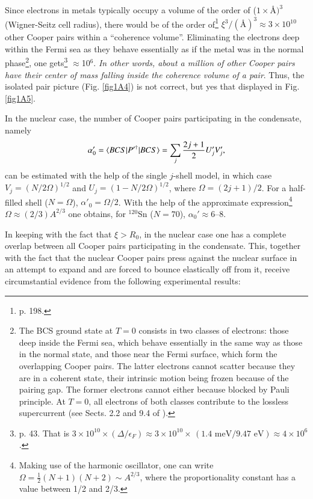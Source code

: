 Since electrons in metals typically occupy a volume of the order of ($1\times$\AA$)^3$ (Wigner-Seitz cell radius), there would be of the order of\footnote{\cite{Ketterson:99} p. 198.} $\xi^3/(\text{\AA})^3\approx 3\times10^{10}$ other Cooper pairs within a ``coherence volume''. Eliminating the electrons deep within the Fermi sea as they behave essentially as if the metal was in the normal phase\footnote{The BCS ground state at $T=0$ consists in two classes of electrons: those deep inside the Fermi sea, which behave essentially in the same way as those in the normal state, and those near the Fermi surface, which form the overlapping Cooper pairs. The latter electrons cannot scatter because they are in a coherent state, their intrinsic motion being frozen because of the pairing gap. The former electrons  cannot either because  blocked by Pauli principle. At $T=0$, all electrons of both classes contribute to the lossless supercurrent (see Sects. 2.2 and 9.4 of \cite{Waldram:96}).}, one gets\footnote{\cite{Schrieffer:64} p. 43.  That is $3\times10^{10}\times(\Delta/\epsilon_F)\approx3\times10^{10}\times\,(1.4\text{ meV}/9.47\text{ eV})\approx 4\times 10^{6}$.} $\approx$10$^6$. \textit{In other words, about a million of other Cooper pairs have their center of mass falling inside the coherence volume of a pair}. Thus, the isolated pair picture (Fig. \ref{fig1A4}) is not correct, but yes that displayed in Fig. \ref{fig1A5}.





 


 In the nuclear case, the number of Cooper pairs participating in the condensate, namely  
 \begin{align}\label{eq3B11}
\alpha'_0=\braket{BCS|P'^\dagger|BCS}=\sum_j\frac{2j+1}{2}U'_jV'_j, \idx{Cooper pair!number of}
 \end{align}
 can be estimated  with the help of the single $j$-shell model, in which case $V_j=(N/2\Omega)^{1/2}$ and $U_j=(1-N/2\Omega)^{1/2}$, where $\Omega=(2j+1)/2$. For a half-filled shell ($N=\Omega$),  $\alpha'_0=\Omega/2$. With the help of the approximate expression\footnote{Making use of the harmonic oscillator, one can write $\Omega=\frac{1}{2}(N+1)(N+2)\sim A^{2/3}$, where the proportionality constant has a value between 1/2 and 2/3.} $\Omega\approx(2/3)A^{2/3}$ one obtains, for $^{120}$Sn ($N=70$), $\alpha_0'\approx6$--8.
 
 
 
 
 In keeping with the fact that $\xi>R_0$, in the nuclear case one has a complete overlap between all Cooper pairs participating in the condensate. This, together with the fact that the nuclear Cooper pairs press against the nuclear surface in an attempt to expand and are forced to bounce elastically off from  it, receive  circumstantial evidence from the following experimental results:
 
